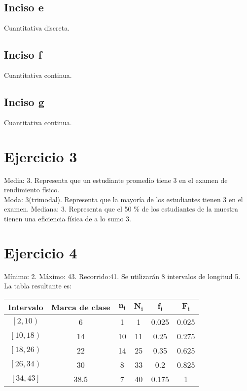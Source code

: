 \documentclass[a4paper,12pt]{article}
\begin{document}
\subsection*{Inciso e}
Cuantitativa discreta.
\subsection*{Inciso f}
Cuantitativa continua.
\subsection*{Inciso g}
Cuantitativa continua.

\section*{Ejercicio 3}
Media: 3. Representa que un estudiante promedio tiene 3 en el examen de rendimiento físico.\\
Moda: 3(trimodal). Representa que la mayoría de los estudiantes tienen 3 en el examen.
Mediana: 3. Representa que el 50 $ \% $ de los estudiantes de la muestra tienen una eficiencia física de a lo sumo 3.
\section*{Ejercicio 4}
Mínimo: 2. Máximo: 43. Recorrido:41. Se utilizarán 8 intervalos de longitud 5.\\
La tabla resultante es:\\
\begin{tabular}{|c|c|c|c|c|c|}
	\hline
	  \textbf{Intervalo}    & \textbf{Marca de clase} & $ \mathbf{n_i} $ & $ \mathbf{N_i} $ & $\mathbf{ f_i} $ & $ \mathbf{F_{i}} $ \\ \hline
	$ \left[ 2,10\right) $  &            6            &        1         &        1         &      0.025       &       0.025        \\ \hline
	$ \left[ 10,18\right) $ &           14            &        10        &        11        &       0.25       &       0.275        \\ \hline
	$ \left[ 18,26\right) $ &           22            &        14        &        25        &       0.35       &       0.625        \\ \hline
	$ \left[ 26,34\right) $ &           30            &        8         &        33        &       0.2        &       0.825        \\ \hline
	$ \left[ 34,43\right] $ &          38.5           &        7         &        40        &      0.175       &         1          \\ \hline
\end{tabular}
\end{document}
